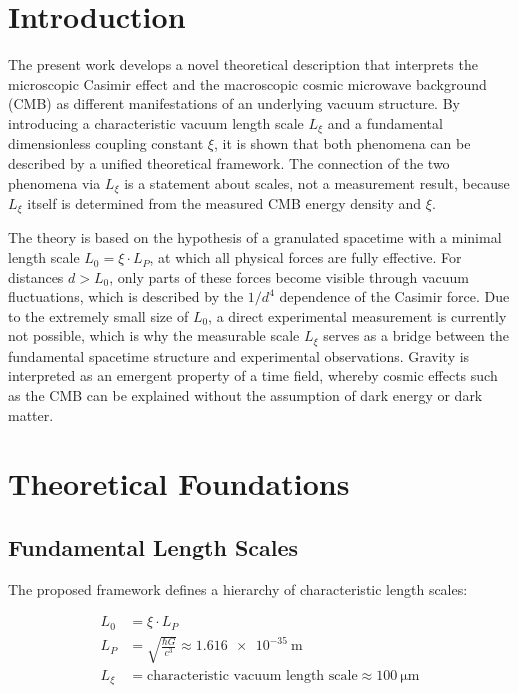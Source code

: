 	\section{Introduction}
	
	The present work develops a novel theoretical description that interprets the microscopic Casimir effect and the macroscopic cosmic microwave background (CMB) as different manifestations of an underlying vacuum structure. By introducing a characteristic vacuum length scale \( L_\xi \) and a fundamental dimensionless coupling constant \( \xi \), it is shown that both phenomena can be described by a unified theoretical framework. The connection of the two phenomena via \( L_\xi \) is a statement about scales, not a measurement result, because \( L_\xi \) itself is determined from the measured CMB energy density and \( \xi \).
	
	The theory is based on the hypothesis of a granulated spacetime with a minimal length scale \( L_0 = \xi \cdot L_P \), at which all physical forces are fully effective. For distances \( d > L_0 \), only parts of these forces become visible through vacuum fluctuations, which is described by the \( 1/d^4 \) dependence of the Casimir force. Due to the extremely small size of \( L_0 \), a direct experimental measurement is currently not possible, which is why the measurable scale \( L_\xi \) serves as a bridge between the fundamental spacetime structure and experimental observations. Gravity is interpreted as an emergent property of a time field, whereby cosmic effects such as the CMB can be explained without the assumption of dark energy or dark matter.
	
	\section{Theoretical Foundations}
	
	\subsection{Fundamental Length Scales}
	
	The proposed framework defines a hierarchy of characteristic length scales:
	
	\begin{align}
		L_0 &= \xi \cdot L_P \label{eq:L0_definition}\\
		L_P &= \sqrt{\frac{\hbar G}{c^3}} \approx \SI{1.616e-35}{\meter} \label{eq:planck_length}\\
		L_\xi &= \text{characteristic vacuum length scale} \approx \SI{100}{\micro\meter} \label{eq:Lxi_definition}
	\end{align}
	
